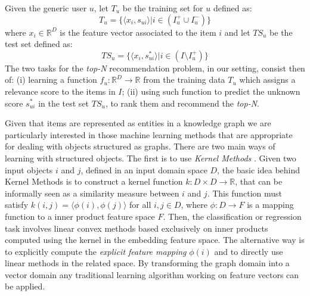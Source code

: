 Given the generic user $u$, let $T_u$ be the training set for $u$ defined as:
\[
T_u=\lbrace \langle x_i,s_{ui} \rangle |  i \in (I_u^+ \cup I_u^-)\rbrace
\] 
where $x_i \in \mathbb{R}^D$ is the feature vector associated to the item $i$ and let $TS_u$ be the test set defined as:
\[
TS_u=\lbrace \langle x_i,s_{ui}^* \rangle |  i \in (I \setminus I_u^+)\rbrace
\]
The two tasks for the \textit{top-N}\xspace recommendation problem, in our setting, consist then of: (i) learning a function $f_u:\mathbb{R}^D \rightarrow \mathbb{R}$ from the training data $T_u$  which assigns a relevance score to the items in $I$; (ii) using such function to predict the unknown score $s_{ui}^*$ in the test set $TS_u$, to rank them and recommend the \textit{top-N}\xspace.

Given that items are represented as entities in a knowledge graph we are particularly interested in those machine learning methods that are appropriate for dealing with objects structured as graphs. 
There are two main ways of learning with structured objects. The first is to use \textit{Kernel Methods} \citep{Cristianini}. 
Given two input objects $i$ and $j$, defined in an input domain space $D$, the basic idea behind Kernel Methods is to construct a kernel function $k: D \times D \rightarrow \mathbb{R}$, that can be informally seen as a similarity measure between $i$ and $j$. This function must satisfy $k(i,j) = \langle \phi(i),\phi(j) \rangle$ for all $i,j \in D$, where $\phi :D \rightarrow F$ is a mapping function to a inner product feature space $F$. 
Then, the classification or regression task involves linear convex methods based exclusively on inner products computed using the kernel in the embedding feature space. 
The alternative way is to explicitly compute the \textit{explicit feature mapping} $\phi(i)$ and to directly use linear methods in the related space. 
By transforming the graph domain into a vector domain any traditional learning algorithm working on feature vectors can be applied. 

